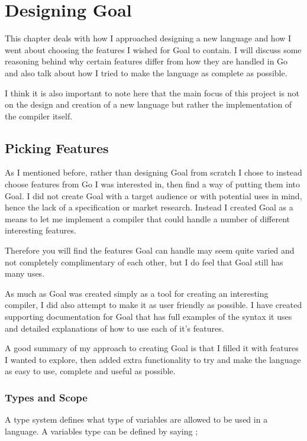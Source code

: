 \chapter{Designing Goal}

This chapter deals with how I approached designing a new language and how I went about choosing the features I wished for Goal to contain. I will discuss some reasoning behind why certain features differ from how they are handled in Go and also talk about how I tried to make the language as complete as possible.

I think it is also important to note here that the main focus of this project is not on the design and creation of a new language but rather the implementation of the compiler itself.

\section{Picking Features}

As I mentioned before, rather than designing Goal from scratch I chose to instead choose features from Go I was interested in, then find a way of putting them into Goal. I did not create Goal with a target audience or with potential uses in mind, hence the lack of a specification or market research. Instead I created Goal as a means to let me implement a compiler that could handle a number of different interesting features.

Therefore you will find the features Goal can handle may seem quite varied and not completely complimentary of each other, but I do feel that Goal still has many uses. 

As much as Goal was created simply as a tool for creating an interesting compiler, I did also attempt to make it as user friendly as possible. I have created supporting documentation for Goal that has full examples of the syntax it uses and detailed explanations of how to use each of it's features.  
 
A good summary of my approach to creating Goal is that I filled it with features I wanted to explore, then added extra functionality to try and make the language as easy to use, complete and useful as possible.
 
\subsection{Types and Scope}

A type system defines what type of variables are allowed to be used in a language. A variables type can be defined by saying \cite[p.~164]{EngComp2012};


